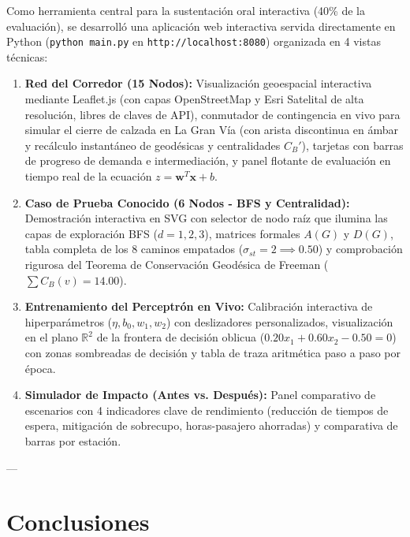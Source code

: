 \documentclass[11pt,letterpaper]{article}
\begin{document}
Como herramienta central para la sustentación oral interactiva (40\% de la evaluación), se desarrolló una aplicación web interactiva servida directamente en Python (\texttt{python main.py} en \texttt{http://localhost:8080}) organizada en 4 vistas técnicas:
\begin{enumerate}
    \item \textbf{Red del Corredor (15 Nodos):} Visualización geoespacial interactiva mediante Leaflet.js (con capas OpenStreetMap y Esri Satelital de alta resolución, libres de claves de API), conmutador de contingencia en vivo para simular el cierre de calzada en La Gran Vía (con arista discontinua en ámbar y recálculo instantáneo de geodésicas y centralidades $C_B'$), tarjetas con barras de progreso de demanda e intermediación, y panel flotante de evaluación en tiempo real de la ecuación $z = \mathbf{w}^T \mathbf{x} + b$.
    \item \textbf{Caso de Prueba Conocido (6 Nodos - BFS y Centralidad):} Demostración interactiva en SVG con selector de nodo raíz que ilumina las capas de exploración BFS ($d=1, 2, 3$), matrices formales $A(G)$ y $D(G)$, tabla completa de los 8 caminos empatados ($\sigma_{st} = 2 \implies 0.50$) y comprobación rigurosa del Teorema de Conservación Geodésica de Freeman ($\sum C_B(v) = 14.00$).
    \item \textbf{Entrenamiento del Perceptrón en Vivo:} Calibración interactiva de hiperparámetros ($\eta, b_0, w_1, w_2$) con deslizadores personalizados, visualización en el plano $\mathbb{R}^2$ de la frontera de decisión oblicua ($0.20 x_1 + 0.60 x_2 - 0.50 = 0$) con zonas sombreadas de decisión y tabla de traza aritmética paso a paso por época.
    \item \textbf{Simulador de Impacto (Antes vs. Después):} Panel comparativo de escenarios con 4 indicadores clave de rendimiento (reducción de tiempos de espera, mitigación de sobrecupo, horas-pasajero ahorradas) y comparativa de barras por estación.
\end{enumerate}

---

\section{Conclusiones}
\end{document}
